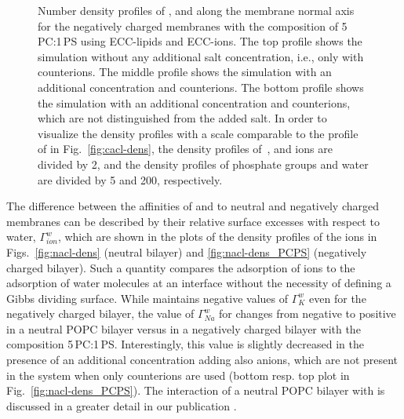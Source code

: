 \begin{figure}[tbp!]
{    Number density profiles of ,  and  along the membrane normal axis 
    for the negatively charged membranes with the composition of 5\,PC:1\,PS using ECC-lipids and ECC-ions.  
    The top profile shows the simulation without any additional salt concentration, i.e., only with  counterions. 
    The middle profile shows the simulation with an additional  concentration and  counterions. 
    The bottom profile shows the simulation with an additional  concentration and  counterions, which are not distinguished from the added salt. 
    In order to visualize the density profiles with a scale comparable to the profile of  in Fig.~\ref{fig:cacl-dens},  
    the density profiles of~,  and  ions are divided by 2, and 
    the density profiles of phosphate groups and water are divided by 5 and 200, respectively.  
    } 
\end{figure} 



The difference between the affinities of  and  to neutral and negatively charged membranes
can be described by their relative surface excesses with respect to water, $\Gamma ^{w} _{ion}$, 
which are shown in the plots of the density profiles of the ions in Figs.~\ref{fig:nacl-dens} (neutral bilayer) and \ref{fig:nacl-dens_PCPS} (negatively charged bilayer). 
Such a quantity compares the adsorption of ions to the adsorption of water molecules at an interface 
without the necessity of defining a Gibbs dividing surface. \citep{melcr18, chattorajBOOK}
While  maintains negative values of $\Gamma^{w}_{K}$ even for the negatively charged bilayer,
the value of $\Gamma^{w}_{Na}$ for  changes from negative to positive
in a neutral POPC bilayer versus in a negatively charged bilayer with the composition 5\,PC:1\,PS.
Interestingly, this value is slightly decreased in the presence of an additional  concentration adding also  anions, 
which are not present in the system when only counterions are used
(bottom resp. top plot in Fig.~\ref{fig:nacl-dens_PCPS}). 
The interaction of a neutral POPC bilayer with  is discussed in a greater detail in our publication \citep{melcr18}. 

 





